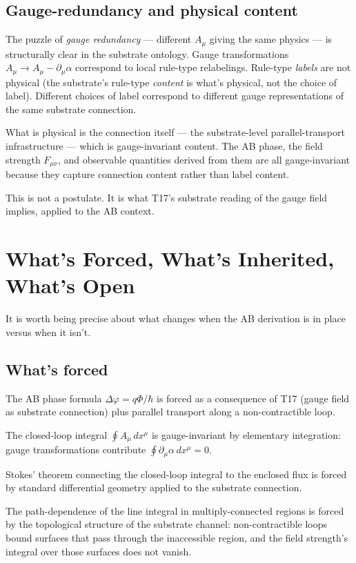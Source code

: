 \documentclass[11pt,a4paper]{article}
\begin{document}
\subsection{Gauge-redundancy and physical content}

The puzzle of \emph{gauge redundancy} --- different $A_\mu$ giving the same physics --- is structurally clear in the substrate ontology. Gauge transformations $A_\mu \to A_\mu - \partial_\mu \alpha$ correspond to local rule-type relabelings. Rule-type \emph{labels} are not physical (the substrate's rule-type \emph{content} is what's physical, not the choice of label). Different choices of label correspond to different gauge representations of the same substrate connection.

What is physical is the connection itself --- the substrate-level parallel-transport infrastructure --- which is gauge-invariant content. The AB phase, the field strength $F_{\mu\nu}$, and observable quantities derived from them are all gauge-invariant because they capture connection content rather than label content.

This is not a postulate. It is what T17's substrate reading of the gauge field implies, applied to the AB context.

\section{What's Forced, What's Inherited, What's Open}

It is worth being precise about what changes when the AB derivation is in place versus when it isn't.

\subsection{What's forced}

The AB phase formula $\Delta\varphi = q\Phi/\hbar$ is forced as a consequence of T17 (gauge field as substrate connection) plus parallel transport along a non-contractible loop.

The closed-loop integral $\oint A_\mu \, dx^\mu$ is gauge-invariant by elementary integration: gauge transformations contribute $\oint \partial_\mu \alpha \, dx^\mu = 0$.

Stokes' theorem connecting the closed-loop integral to the enclosed flux is forced by standard differential geometry applied to the substrate connection.

The path-dependence of the line integral in multiply-connected regions is forced by the topological structure of the substrate channel: non-contractible loops bound surfaces that pass through the inaccessible region, and the field strength's integral over those surfaces does not vanish.
\end{document}
